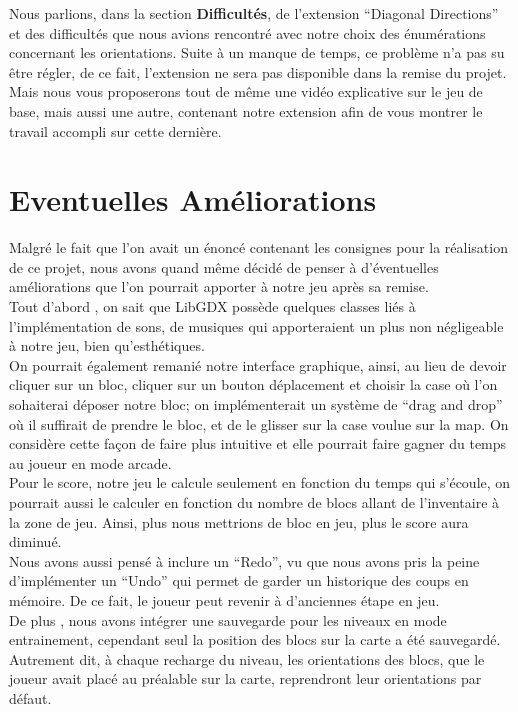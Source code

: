 \documentclass[a4paper,10pt]{article}
\begin{document}
Nous parlions, dans la section \textbf{Difficultés}, de l'extension ``Diagonal Directions'' et des difficultés que nous avions rencontré avec notre
choix des énumérations concernant les orientations. Suite à un manque de temps, ce problème n'a pas su être régler, de ce fait, l'extension ne sera pas disponible
dans la remise du projet. Mais nous vous proposerons tout de même une vidéo explicative sur le jeu de base, mais aussi une autre, contenant notre extension
afin de vous montrer le travail accompli sur cette dernière.


\section{Eventuelles Améliorations}
Malgré le fait que l'on avait un énoncé contenant les consignes pour la réalisation de ce projet, nous avons quand même décidé de penser à d'éventuelles
améliorations que l'on pourrait apporter à notre jeu après sa remise.\\
Tout d'abord , on sait que LibGDX possède quelques classes liés à l'implémentation de sons, de musiques qui apporteraient un plus
non négligeable à notre jeu, bien qu'esthétiques.\\
On pourrait également remanié notre interface graphique, ainsi, au lieu de devoir cliquer sur un bloc, cliquer sur un bouton déplacement
et choisir la case où l'on sohaiterai déposer notre bloc; on implémenterait un système de ``drag and drop'' où il suffirait de prendre le bloc,
et de le glisser sur la case voulue sur la map. On considère cette façon de faire plus intuitive et elle pourrait faire gagner du temps au joueur
en mode arcade.\\
Pour le score, notre jeu le calcule seulement en fonction du temps qui s'écoule, on pourrait aussi le calculer en fonction du nombre de blocs allant
de l'inventaire à la zone de jeu. Ainsi, plus nous mettrions de bloc en jeu, plus le score aura diminué. \\
Nous avons aussi pensé à inclure un ``Redo'', vu que nous avons pris la peine d'implémenter un ``Undo'' qui permet de garder un historique des coups en
mémoire. De ce fait, le joueur peut revenir à d'anciennes étape en jeu. \\
De plus , nous avons intégrer une sauvegarde pour les niveaux en mode entrainement, cependant seul la position des blocs sur la carte a été sauvegardé.
Autrement dit, à chaque recharge du niveau, les orientations des blocs, que le joueur avait placé au préalable sur la carte, reprendront leur 
orientations par défaut. 
\end{document}
